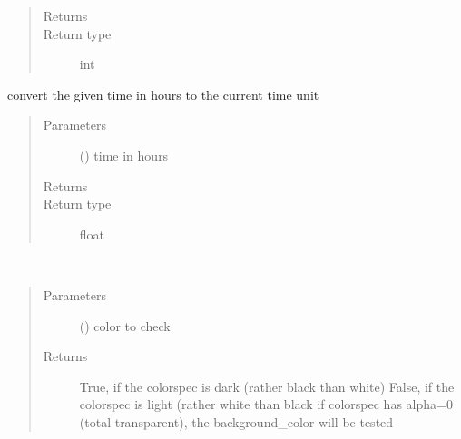 \documentclass[letterpaper,10pt,english]{sphinxmanual}
\begin{document}
\begin{fulllineitems}
\begin{fulllineitems}
\begin{quote}
\begin{description}
\item[{Returns}] \leavevmode
{}

\item[{Return type}] \leavevmode
int

\end{description}\end{quote}

\end{fulllineitems}


\begin{fulllineitems}
\label{\detokenize{Reference:salabim.Environment.hours}}
convert the given time in hours to the current time unit
\begin{quote}\begin{description}
\item[{Parameters}] \leavevmode
{} () \textendash{} time in hours

\item[{Returns}] \leavevmode
{}

\item[{Return type}] \leavevmode
float

\end{description}\end{quote}

\end{fulllineitems}


\begin{fulllineitems}
\label{\detokenize{Reference:salabim.Environment.is_dark}}~\begin{quote}\begin{description}
\item[{Parameters}] \leavevmode
{} () \textendash{} color to check

\item[{Returns}] \leavevmode
True, if the colorspec is dark (rather black than white) 
False, if the colorspec is light (rather white than black 
if colorspec has alpha=0 (total transparent), the background\_color will be tested


\end{description}
\end{quote}
\end{fulllineitems}
\end{fulllineitems}
\end{document}
